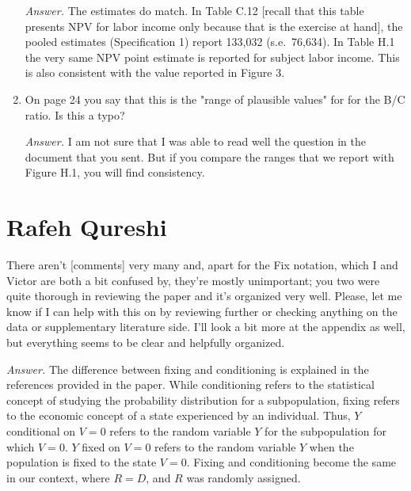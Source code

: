 \begin{enumerate}
\noindent \textit{Answer.} The estimates do match. In Table C.12 [recall that this table presents NPV for labor income only because that is the exercise at hand], the pooled estimates (Specification 1) report 133,032 (s.e.\ 76,634). In Table H.1 the very same NPV point estimate is reported for subject labor income. This is also consistent with the value reported in Figure 3. 

\item On page 24 you say that this is the "range of plausible values" for for the B/C ratio. Is this a typo? 

\noindent \textit{Answer.}  I am not sure that I was able to read well the question in the document that you sent. But if you compare the ranges that we report with Figure H.1, you will find consistency.
\end{enumerate}

\section{Rafeh Qureshi}

There aren’t [comments] very many and, apart for the Fix notation, which I and Victor are both a bit confused by, they’re mostly unimportant; you two were quite thorough in reviewing the paper and it’s organized very well. Please, let me know if I can help with this on by reviewing further or checking anything on the data or supplementary literature side. I’ll look a bit more at the appendix as well, but everything seems to be clear and helpfully organized.

\textit{Answer.} The difference between fixing and conditioning is explained in the references provided in the paper. While conditioning refers to the statistical concept of studying the probability distribution for a subpopulation, fixing refers to the economic concept of a state experienced by an individual. Thus, $Y$ conditional on $V = 0$ refers to the random variable $Y$ for the subpopulation for which $V = 0$. $Y$ fixed on $V = 0$ refers to the random variable $Y$ when the population is fixed to the state $V = 0$. Fixing and conditioning become the same in our context, where $R = D$, and $R$ was randomly assigned.


